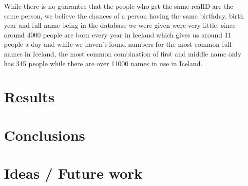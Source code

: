 \documentclass[tog]{acmsiggraph}
\begin{document}
While there is no guarantee that the people who get the same realID are the same person, we believe the chances of a person having the same birthday, birth year and full name being in the database we were given were very little, since around 4000 people are born every year in Iceland which gives us around 11 people a day and while we haven't found numbers for the most common full names in Iceland, the most common combination of first and middle name only has 345 people while there are over 11000 names in use in Iceland.

\section{Results}

\section{Conclusions}

\section{Ideas / Future work}





\printbibliography
\end{document}
